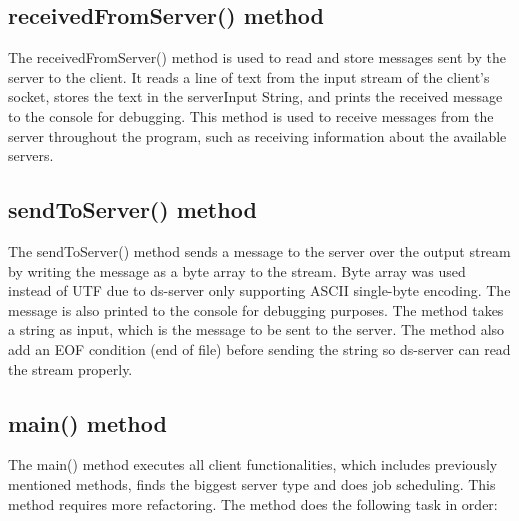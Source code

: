 \documentclass[a4paper]{article} %
\begin{document}
\subsection{receivedFromServer() method}
The receivedFromServer() method is used to read and store messages sent by the server to the client. It reads a line of text from the input stream of the client's socket, stores the text in the serverInput String, and prints the received message to the console for debugging. This method is used to receive messages from the server throughout the program, such as receiving information about the available servers.
\subsection{sendToServer() method}
The sendToServer() method sends a message to the server over the output stream by writing the message as a byte array to the stream. Byte array was used instead of UTF due to ds-server only supporting ASCII single-byte encoding. The message is also printed to the console for debugging purposes. The method takes a string as input, which is the message to be sent to the server. The method also add an EOF condition (end of file) before sending the string so ds-server can read the stream properly.
\subsection{main() method}
The main() method executes all client functionalities, which includes previously mentioned methods, finds the biggest server type and does job scheduling. This method requires more refactoring. The method does the following task in order:
\end{document}

